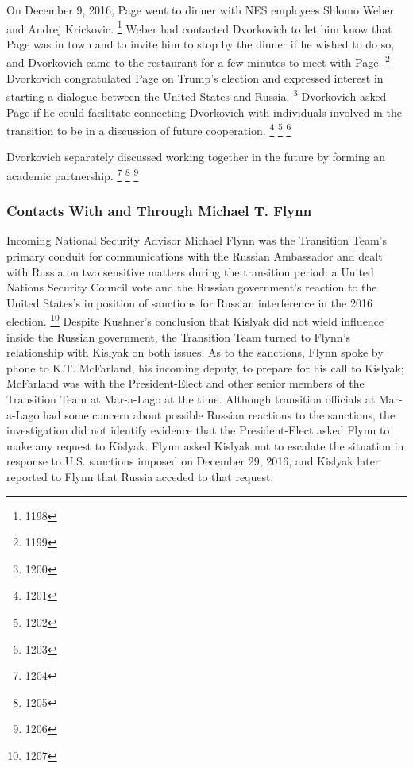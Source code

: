 On December 9, 2016, Page went to dinner with NES employees Shlomo Weber and Andrej Krickovic.%
\footnote{1198}
Weber had contacted Dvorkovich to let him know that Page was in town and to invite him to stop by the dinner if he wished to do so, and Dvorkovich came to the restaurant for a few minutes to meet with Page.%
\footnote{1199}
Dvorkovich congratulated Page on Trump's election and expressed interest in starting a dialogue between the United States and Russia.%
\footnote{1200}
Dvorkovich asked Page if he could facilitate connecting Dvorkovich with individuals involved in the transition to be in a discussion of future cooperation.%
\footnote{1201}
\footnote{1202}
\footnote{1203}

Dvorkovich separately discussed working together in the future by forming an academic partnership.%
\footnote{1204}
\footnote{1205}
\footnote{1206}

\subsubsection{Contacts With and Through Michael T. Flynn}

Incoming National Security Advisor Michael Flynn was the Transition Team's primary conduit for communications with the Russian Ambassador and dealt with Russia on two sensitive matters during the transition period: a United Nations Security Council vote and the Russian government's reaction to the United States's imposition of sanctions for Russian interference in the 2016 election.%
\footnote{1207}
Despite Kushner's conclusion that Kislyak did not wield influence inside the Russian government, the Transition Team turned to Flynn's relationship with Kislyak on both issues.
As to the sanctions, Flynn spoke by phone to K.T. McFarland, his incoming deputy, to prepare for his call to Kislyak; McFarland was with the President-Elect and other senior members of the Transition Team at Mar-a-Lago at the time.
Although transition officials at Mar-a-Lago had some concern about possible Russian reactions to the sanctions, the investigation did not identify evidence that the President-Elect asked Flynn to make any request to Kislyak.
Flynn asked Kislyak not to escalate the situation in response to U.S. sanctions imposed on December 29, 2016, and Kislyak later reported to Flynn that Russia acceded to that request.

